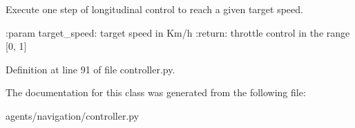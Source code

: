 \begin{DoxyVerb}Execute one step of longitudinal control to reach a given target speed.

:param target_speed: target speed in Km/h
:return: throttle control in the range [0, 1]
\end{DoxyVerb}
 

Definition at line 91 of file controller.\+py.



The documentation for this class was generated from the following file\+:\begin{DoxyCompactItemize}
\item 
agents/navigation/controller.\+py\end{DoxyCompactItemize}
